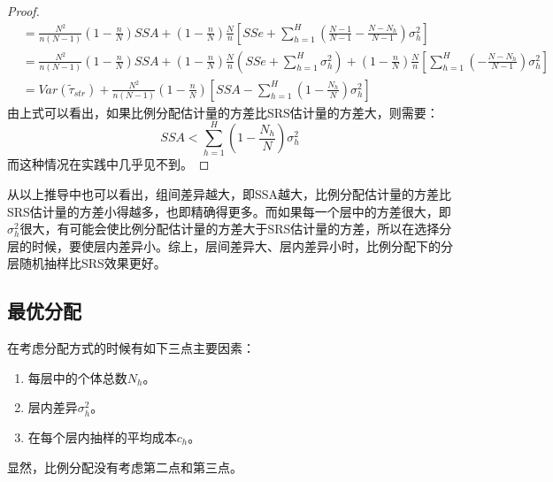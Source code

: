 \begin{proof}
\begin{align*}
		&=\frac{N^2}{n(N-1)}\left(1-\frac{n}{N}\right)SSA+\left(1-\frac{n}{N}\right)\frac{N}{n}\left[SSe+\sum_{h=1}^H\left(\frac{N-1}{N-1}-\frac{N-N_h}{N-1}\right)\sigma_h^2\right] \\
		&=\frac{N^2}{n(N-1)}\left(1-\frac{n}{N}\right)SSA+\left(1-\frac{n}{N}\right)\frac{N}{n}\left(SSe+\sum_{h=1}^H\sigma_h^2\right)+\left(1-\frac{n}{N}\right)\frac{N}{n}\left[\sum_{h=1}^H\left(-\frac{N-N_h}{N-1}\right)\sigma_h^2\right] \\
		&=Var(\tilde{\tau}_{str})+\frac{N^2}{n(N-1)}\left(1-\frac{n}{N}\right)\left[SSA-\sum_{h=1}^H\left(1-\frac{N_h}{N}\right)\sigma_h^2\right]
	\end{align*}
	由上式可以看出，如果比例分配估计量的方差比SRS估计量的方差大，则需要：
	\begin{equation*}
		SSA<\sum_{h=1}^H\left(1-\frac{N_h}{N}\right)\sigma_h^2
	\end{equation*}
	而这种情况在实践中几乎见不到。
\end{proof}
从以上推导中也可以看出，组间差异越大，即SSA越大，比例分配估计量的方差比SRS估计量的方差小得越多，也即精确得更多。而如果每一个层中的方差很大，即$\sigma_h^2$很大，有可能会使比例分配估计量的方差大于SRS估计量的方差，所以在选择分层的时候，要使层内差异小。综上，层间差异大、层内差异小时，比例分配下的分层随机抽样比SRS效果更好。

\subsection{最优分配}
在考虑分配方式的时候有如下三点主要因素：
\begin{enumerate}
	\item 每层中的个体总数$N_h$。
	\item 层内差异$\sigma_h^2$。
	\item 在每个层内抽样的平均成本$c_h$。
\end{enumerate}
显然，比例分配没有考虑第二点和第三点。
